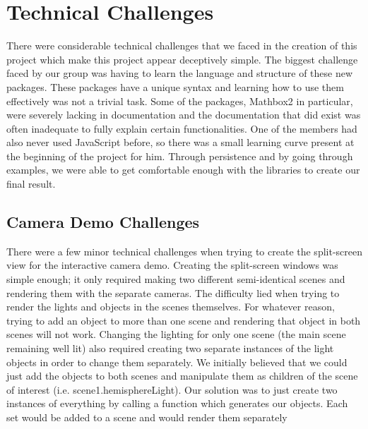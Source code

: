 \documentclass{acm_proc_article-sp}
\begin{document}
\section{Technical Challenges}
There were considerable technical challenges that we faced in the creation of
this project which make this project appear deceptively simple. The biggest
challenge faced by our group was having to learn the language and structure of
these new packages. These packages have a unique syntax and learning how to use
them effectively was not a trivial task. Some of the packages, Mathbox2 in
particular, were severely lacking in documentation and the documentation that
did exist was often inadequate to fully explain certain functionalities. One of
the members had also never used JavaScript before, so there was a small
learning curve present at the beginning of the project for him. Through
persistence and by going through examples, we were able to get comfortable
enough with the libraries to create our final result.

\subsection{Camera Demo Challenges}
There were a few minor technical challenges when trying to create the
split-screen view for the interactive camera demo. Creating the split-screen
windows was simple enough; it only required making two different semi-identical
scenes and rendering them with the separate cameras. The difficulty lied when
trying to render the lights and objects in the scenes themselves. For whatever
reason, trying to add an object to more than one scene and rendering that
object in both scenes will not work. Changing the lighting for only one scene
(the main scene remaining well lit) also required creating two separate
instances of the light objects in order to change them separately. We initially
believed that we could just add the objects to both scenes and manipulate them
as children of the scene of interest (i.e. scene1.hemisphereLight). Our
solution was to just create two instances of everything by calling a function
which generates our objects. Each set would be added to a scene and would
render them separately
\end{document}
